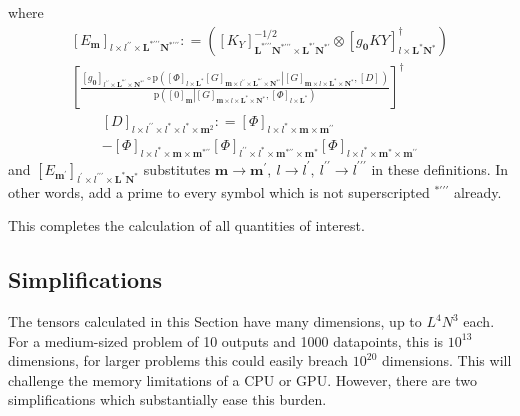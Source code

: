 \documentclass[preprint,12pt]{elsarticle}
\newcommand*{\M}[1]{\ensuremath{#1}\xspace}
\newcommand*{\x}{\times}
\newcommand*{\mi}[1]{\mathbf{#1}}
\newcommand*{\te}[2][]{\left\lbrack{#2}\right\rbrack_{#1}}
\newcommand*{\prob}[3]{\M{\mathrm{p}\!\left(\left.{#1}\right\vert{#2,#3}\right)}}
\newcommand*{\deq}{\M{\mathrel{\mathop:}=}}
\begin{document}
        where
        \begin{multline*}
            \te[l\x l^{\prime\prime}\x \mi{L^{*\prime\prime\prime}N^{*\prime\prime\prime}}]{E_{\mi{m}}} \deq 
            \left(
                \te[\mi{L^{*\prime\prime\prime}N^{*\prime\prime\prime}}\x\mi{L^{*\prime}N^{*\prime}}]{K_{Y}}^{-1/2} \otimes \te[l\x\mi{L^{*}N^{*}}]{g_{\mi{0}}KY}^{\dagger} \right) \\
            \left\lbrack\frac{
            \te[l^{\prime\prime}\x\mi{L^{*\prime}}\x\mi{N^{*\prime}}]{g_{\mi{0}}} \circ
            \prob
            {\te[l\x \mi{L^{*}}]{\Phi} 
            \te[\mi{m}\x l^{\prime\prime}\x \mi{L^{*\prime}\x N^{*\prime}}]{G}}
            {\te[\mi{m}\x l\x \mi{L^{*}\x N^{*}}]{G}}
            {\te[]{D}}}
            {\prob{\te[\mi{m}]{0}}{\te[\mi{m}\x l\x \mi{L^{*}\x N^{*}}]{G}}{\te[l\x \mi{L^{*}}]{\Phi}}} \right\rbrack^{\dagger}
        \end{multline*}
        \begin{multline*}
            \te[l\x l^{\prime\prime} \x l^{*}\x l^{*}\x\mi{m}^{2}]{D} \deq \te[l\x l^{*}\x\mi{m}\x\mi{m^{\prime\prime}}]{\Phi} \\ 
            - \te[l\x l^{*}\x\mi{m}\x\mi{m^{*\prime\prime}}]{\Phi}
            \te[l^{\prime\prime}\x l^{*}\x\mi{m^{*\prime\prime}}\x\mi{m^{*}}]{\Phi}
            \te[l\x l^{*}\x\mi{m^{*}}\x\mi{m^{\prime\prime}}]{\Phi}
        \end{multline*}
        and $\te[l^{\prime}\x l^{\prime\prime\prime}\x \mi{L^{*}N^{*}}]{E_{\mi{m^{\prime}}}}$ substitutes $\mi{m}\rightarrow\mi{m^{\prime}},\ l\rightarrow l^{\prime},\ l^{\prime\prime}\rightarrow l^{\prime\prime\prime}$ in these definitions. In other words, add a prime to every symbol which is not superscripted $^{*\prime\prime\prime}$ already.

        This completes the calculation of all quantities of interest.

        \subsection{Simplifications}\label{sub:GPEst:Simp}
        The tensors calculated in this Section have many dimensions, up to $L^{4}N^{3}$ each. For a medium-sized problem of 10 outputs and 1000 datapoints, this is $10^{13}$ dimensions, for larger problems this could easily breach $10^{20}$ dimensions. This will challenge the memory limitations of a CPU or GPU. However, there are two simplifications which substantially ease this burden.
\end{document}
